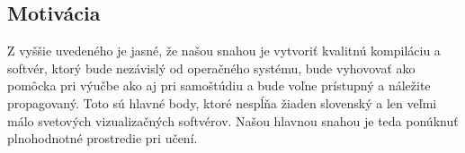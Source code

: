 \subsection*{Motivácia}
Z vyššie uvedeného je jasné, že našou snahou je vytvoriť kvalitnú kompiláciu 
a softvér, ktorý bude nezávislý od operačného systému, bude vyhovovať ako 
pomôcka pri výučbe ako aj pri samoštúdiu a bude voľne prístupný a náležite 
propagovaný. Toto sú hlavné body, ktoré nespĺňa žiaden slovenský a 
len veľmi málo svetových vizualizačných softvérov. Našou hlavnou snahou 
je teda ponúknuť plnohodnotné prostredie pri učení.
%

